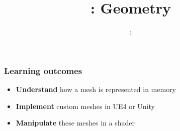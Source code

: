 \usepackage{../../beamerthemeFalmouthGamesAcademy}
\usepackage{multimedia}
\graphicspath{ {../../} }


\usepackage[normalem]{ulem}
\usepackage{wasysym}

\usepackage{pdfpages}

\usetikzlibrary{arrows,automata}




\title{\sessionnumber: Geometry}
\subtitle{\modulecode: \moduletitle}

\frame{\titlepage} 

\begin{frame}
	\frametitle{Learning outcomes}
	\begin{itemize}
		\item \textbf{Understand} how a mesh is represented in memory
		\item \textbf{Implement} custom meshes in UE4 or Unity
		\item \textbf{Manipulate} these meshes in a shader
	\end{itemize}
\end{frame}










